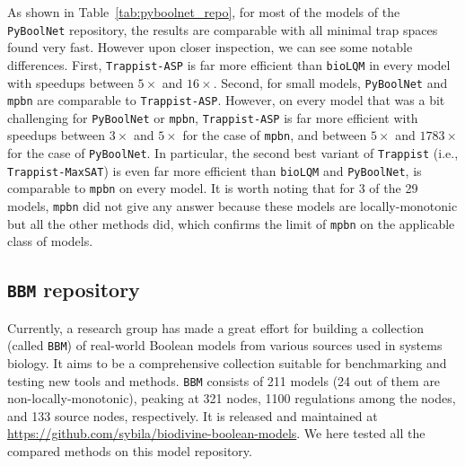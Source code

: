 \documentclass[preprint,12pt]{elsarticle}
\begin{document}
As shown in Table~\ref{tab:pyboolnet_repo}, for most of the models of the \texttt{PyBoolNet} repository, the results are comparable with all minimal trap spaces found very fast.
However upon closer inspection, we can see some notable differences.
First, \texttt{Trappist-ASP} is far more efficient than \texttt{bioLQM} in every model with speedups between \(5\times\) and \(16 \times\).
Second, for small models, \texttt{PyBoolNet} and \texttt{mpbn} are comparable to \texttt{Trappist-ASP}.
However, on every model that was a bit challenging for \texttt{PyBoolNet} or \texttt{mpbn}, \texttt{Trappist-ASP} is far more efficient with speedups between \(3\times\) and \(5 \times\) for the case of \texttt{mpbn}, and between \(5\times\) and \(1783 \times\) for the case of \texttt{PyBoolNet}.
In particular, the second best variant of \texttt{Trappist} (i.e., \texttt{Trappist-MaxSAT}) is even far more efficient than \texttt{bioLQM} and \texttt{PyBoolNet}, is comparable to \texttt{mpbn} on every model.
It is worth noting that for 3 of the 29 models, \texttt{mpbn} did not give any answer because these models are locally-monotonic but all the other methods did, which confirms the limit of \texttt{mpbn} on the applicable class of models.


\subsection{\texttt{BBM} repository}

Currently, a research group has made a great effort for building a collection (called \texttt{BBM}) of real-world Boolean models from various sources used in systems biology.
It aims to be a comprehensive collection suitable for benchmarking and testing new tools and methods.
\texttt{BBM} consists of 211 models (24 out of them are non-locally-monotonic), peaking at 321 nodes, 1100 regulations among the nodes, and 133 source nodes, respectively.
It is released and maintained at \url{https://github.com/sybila/biodivine-boolean-models}.
We here tested all the compared methods on this model repository.
\end{document}
